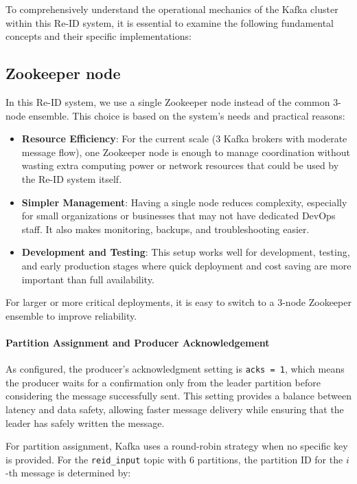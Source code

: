 To comprehensively understand the operational mechanics of the Kafka cluster within this Re-ID system, it is essential to examine the following fundamental concepts and their specific implementations:

\subsection{Zookeeper node}

In this Re-ID system, we use a single Zookeeper node instead of the common 3-node ensemble. This choice is based on the system's needs and practical reasons:

\begin{itemize}
    \item \textbf{Resource Efficiency}: For the current scale (3 Kafka brokers with moderate message flow), one Zookeeper node is enough to manage coordination without wasting extra computing power or network resources that could be used by the Re-ID system itself.
    
    \item \textbf{Simpler Management}: Having a single node reduces complexity, especially for small organizations or businesses that may not have dedicated DevOps staff. It also makes monitoring, backups, and troubleshooting easier.
    
    \item \textbf{Development and Testing}: This setup works well for development, testing, and early production stages where quick deployment and cost saving are more important than full availability.
\end{itemize}

For larger or more critical deployments, it is easy to switch to a 3-node Zookeeper ensemble to improve reliability.

\paragraph{Partition Assignment and Producer Acknowledgement}

As configured, the producer's acknowledgment setting is \texttt{acks = 1}, which means the producer waits for a confirmation only from the leader partition before considering the message successfully sent. This setting provides a balance between latency and data safety, allowing faster message delivery while ensuring that the leader has safely written the message.

For partition assignment, Kafka uses a round-robin strategy when no specific key is provided. For the \texttt{reid\_input} topic with 6 partitions, the partition ID for the \(i\)-th message is determined by:

